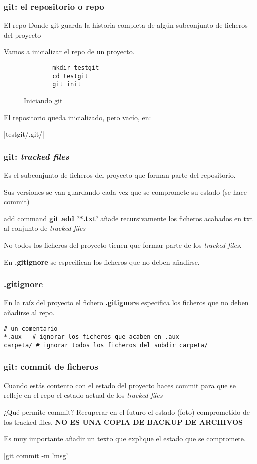 \documentclass{beamer}
\begin{document}
\begin{frame}[fragile=singleslide]
	\frametitle{git: el repositorio o repo}
	\begin{block}{El repo}
		Donde git guarda la historia completa de algún subconjunto de ficheros del proyecto
	\end{block}
	Vamos a inicializar el repo de un proyecto.
	\begin{figure}
		\begin{verbatim}
		mkdir testgit
		cd testgit
		git init	
		\end{verbatim}
		\caption{Iniciando git}
	\end{figure}
		El repositorio queda inicializado, pero vacío, en:
		
		|testgit/.git/|
		
\end{frame}

\begin{frame}[fragile]
	\frametitle{git: \textit{tracked files}}
	Es el subconjunto de ficheros del proyecto que forman parte del repositorio.
	
	Sus versiones se van guardando cada vez que se compromete su estado (se hace commit)
	
	\begin{block}{add command}
		\textbf{git add '*.txt'} añade recursivamente los ficheros acabados en txt al conjunto de \textit{tracked files}
	\end{block} 
	No todos los ficheros del proyecto tienen que formar parte de los \textit{tracked files}.
	
	En \textbf{.gitignore} se especifican los ficheros que no deben añadirse.
	
	
\end{frame}

\begin{frame}[fragile]
\frametitle{.gitignore}
En la raíz del proyecto el fichero \textbf{.gitignore} especifica los ficheros que no deben añadirse al repo.
\begin{verbatim}
# un comentario
*.aux   # ignorar los ficheros que acaben en .aux
carpeta/ # ignorar todos los ficheros del subdir carpeta/
\end{verbatim}


\end{frame}

\begin{frame}[fragile]
	\frametitle{git: commit de ficheros}
	Cuando estás contento con el estado del proyecto haces commit para que se refleje en el repo el estado actual de los \textit{tracked files}
	\begin{block}{¿Qué permite commit?}
		Recuperar en el futuro el estado (foto) comprometido de los tracked files.
		\textbf{ NO ES UNA COPIA DE BACKUP DE ARCHIVOS}
	\end{block}
	Es muy importante añadir un texto que explique el estado que se compromete.
	
	|git commit -m 'msg'|
	

\end{frame}
\end{document}
